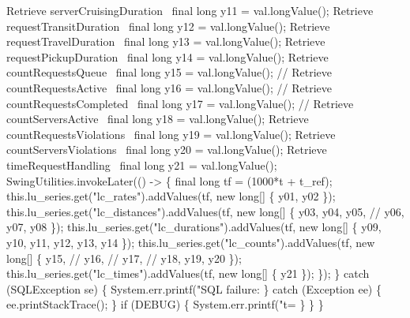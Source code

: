       \LA{}Retrieve serverCruisingDuration~{\nwtagstyle{}}\RA{}    final long y11 = val.longValue();
      \LA{}Retrieve requestTransitDuration~{\nwtagstyle{}}\RA{}    final long y12 = val.longValue();
      \LA{}Retrieve requestTravelDuration~{\nwtagstyle{}}\RA{}     final long y13 = val.longValue();
      \LA{}Retrieve requestPickupDuration~{\nwtagstyle{}}\RA{}     final long y14 = val.longValue();
      \LA{}Retrieve countRequestsQueue~{\nwtagstyle{}}\RA{}        final long y15 = val.longValue();
//      \LA{}Retrieve countRequestsActive~{\nwtagstyle{}}\RA{}       final long y16 = val.longValue();
//      \LA{}Retrieve countRequestsCompleted~{\nwtagstyle{}}\RA{}    final long y17 = val.longValue();
//      \LA{}Retrieve countServersActive~{\nwtagstyle{}}\RA{}        final long y18 = val.longValue();
      \LA{}Retrieve countRequestsViolations~{\nwtagstyle{}}\RA{}   final long y19 = val.longValue();
      \LA{}Retrieve countServersViolations~{\nwtagstyle{}}\RA{}    final long y20 = val.longValue();
      \LA{}Retrieve timeRequestHandling~{\nwtagstyle{}}\RA{}       final long y21 = val.longValue();
      SwingUtilities.invokeLater(() -> \{
         final long tf = (1000*t + t_ref);
         this.lu_series.get("lc_rates").addValues(tf, new long[] \{
            y01,
            y02 \});
         this.lu_series.get("lc_distances").addValues(tf, new long[] \{
            y03,
            y04,
            y05,
//            y06,
            y07,
            y08 \});
         this.lu_series.get("lc_durations").addValues(tf, new long[] \{
            y09,
            y10,
            y11,
            y12,
            y13,
            y14 \});
         this.lu_series.get("lc_counts").addValues(tf, new long[] \{
            y15,
//            y16,
//            y17,
//            y18,
            y19,
            y20 \});
         this.lu_series.get("lc_times").addValues(tf, new long[] \{
            y21 \});
      \});
    \} catch (SQLException se) \{
      System.err.printf("SQL failure: %
    \} catch (Exception ee) \{
      ee.printStackTrace();
    \}
    if (DEBUG) \{
      System.err.printf("t=%
    \}
  \}
\}
\nwendcode{}\nwdocspar

